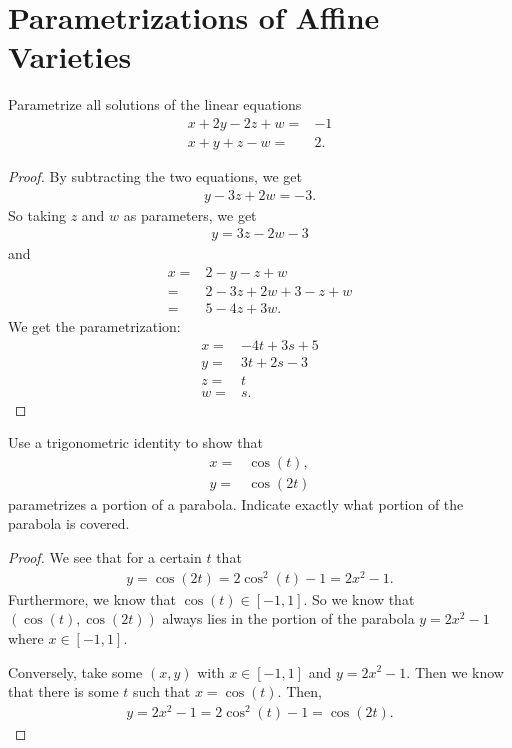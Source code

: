 \section{Parametrizations of Affine Varieties}


\begin{exercise}{1}
Parametrize all solutions of the linear equations
\begin{align*}
    x + 2y - 2z + w =& -1\\
    x + y + z - w =& 2.
\end{align*}
\end{exercise}
\begin{proof}
    By subtracting the two equations, we get
    \begin{align*}
        y - 3z + 2w = -3.
    \end{align*}
    So taking $z$ and $w$ as parameters, we get
    \begin{align*}
        y = 3z - 2w - 3
    \end{align*}
    and
    \begin{align*}
        x
        =& 2 - y - z +w\\
        =& 2 -3z +2w + 3 -z + w\\
        =& 5 - 4z + 3w.
    \end{align*}
    We get the parametrization:
    \begin{align*}
        x =& -4t + 3s + 5\\
        y =& 3t + 2s - 3\\
        z =& t\\
        w =& s.
    \end{align*}
\end{proof}

\begin{exercise}{2}
    Use a trigonometric identity to show that
    \begin{align*}
        x =& \cos(t),\\
        y =& \cos(2t)
    \end{align*}
    parametrizes a portion of a parabola. 
    Indicate exactly what portion of the parabola is covered.
\end{exercise}
\begin{proof}
    We see that for a certain $t$ that
    \begin{align*}
        y = \cos(2t) = 2\cos^2(t) - 1 = 2x^2 - 1.
    \end{align*}
    Furthermore, we know that $\cos(t)\in [-1,1]$. 
    So we know that $(\cos(t), \cos(2t))$ always lies in the portion of the parabola $y = 2x^2 -1$ where $x\in [-1,1]$.
    
    Conversely, take some $(x,y)$ with $x\in [-1,1]$ and $y = 2x^2 - 1$. 
    Then we know that there is some $t$ such that $x=\cos(t)$. 
    Then,
    \begin{align*}
        y = 2x^2 - 1 = 2\cos^2(t) - 1 = \cos(2t).
    \end{align*}
\end{proof}

